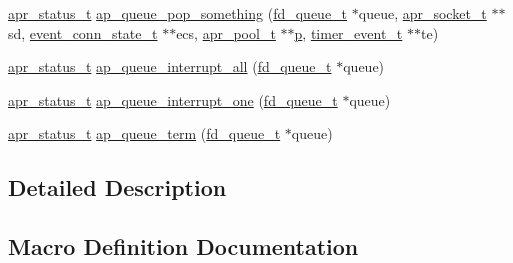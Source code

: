 \begin{DoxyCompactItemize}
\item 
\hyperlink{group__apr__errno_gaa5105fa83cc322f09382292db8b47593}{apr\+\_\+status\+\_\+t} \hyperlink{group__APACHE__MPM__EVENT_gaea3aa3dc980104c89fc3fa768bc5aaea}{ap\+\_\+queue\+\_\+pop\+\_\+something} (\hyperlink{structfd__queue__t}{fd\+\_\+queue\+\_\+t} $\ast$queue, \hyperlink{structapr__socket__t}{apr\+\_\+socket\+\_\+t} $\ast$$\ast$sd, \hyperlink{structevent__conn__state__t}{event\+\_\+conn\+\_\+state\+\_\+t} $\ast$$\ast$ecs, \hyperlink{structapr__pool__t}{apr\+\_\+pool\+\_\+t} $\ast$$\ast$\hyperlink{group__APACHE__CORE__MPM_ga5cd91701e5c167f2b1a38e70ab57817e}{p}, \hyperlink{structtimer__event__t}{timer\+\_\+event\+\_\+t} $\ast$$\ast$te)
\item 
\hyperlink{group__apr__errno_gaa5105fa83cc322f09382292db8b47593}{apr\+\_\+status\+\_\+t} \hyperlink{group__APACHE__MPM__EVENT_ga6a9df0d76a287d52f8ea78b6ebce9c27}{ap\+\_\+queue\+\_\+interrupt\+\_\+all} (\hyperlink{structfd__queue__t}{fd\+\_\+queue\+\_\+t} $\ast$queue)
\item 
\hyperlink{group__apr__errno_gaa5105fa83cc322f09382292db8b47593}{apr\+\_\+status\+\_\+t} \hyperlink{group__APACHE__MPM__EVENT_gae8c79d988912470cbc9313930133afb3}{ap\+\_\+queue\+\_\+interrupt\+\_\+one} (\hyperlink{structfd__queue__t}{fd\+\_\+queue\+\_\+t} $\ast$queue)
\item 
\hyperlink{group__apr__errno_gaa5105fa83cc322f09382292db8b47593}{apr\+\_\+status\+\_\+t} \hyperlink{group__APACHE__MPM__EVENT_gabd40aa9d9c5f2cd9a23d912200158c5f}{ap\+\_\+queue\+\_\+term} (\hyperlink{structfd__queue__t}{fd\+\_\+queue\+\_\+t} $\ast$queue)
\end{DoxyCompactItemize}


\subsection{Detailed Description}


\subsection{Macro Definition Documentation}
